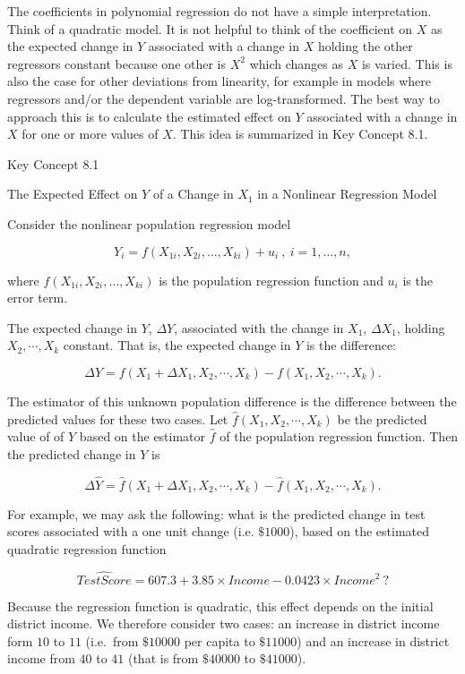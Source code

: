 \documentclass[]{book}
\theoremstyle{definition}
\theoremstyle{definition}
\theoremstyle{definition}
\theoremstyle{remark}
\begin{document}
The coefficients in polynomial regression do not have a simple
interpretation. Think of a quadratic model. It is not helpful to think
of the coefficient on \(X\) as the expected change in \(Y\) associated
with a change in \(X\) holding the other regressors constant because one
other is \(X^2\) which changes as \(X\) is varied. This is also the case
for other deviations from linearity, for example in models where
regressors and/or the dependent variable are log-transformed. The best
way to approach this is to calculate the estimated effect on \(Y\)
associated with a change in \(X\) for one or more values of \(X\). This
idea is summarized in Key Concept 8.1.

Key Concept 8.1

The Expected Effect on \(Y\) of a Change in \(X_1\) in a Nonlinear
Regression Model

Consider the nonlinear population regression model

\[ Y_i = f(X_{1i}, X_{2i}, \dots, X_{ki}) + u_i \ , \ i=1,\dots,n,\]

where \(f(X_{1i}, X_{2i}, \dots, X_{ki})\) is the population regression
function and \(u_i\) is the error term.

The expected change in \(Y\), \(\Delta Y\), associated with the change
in \(X_1\), \(\Delta X_1\), holding \(X_2, \cdots , X_k\) constant. That
is, the expected change in \(Y\) is the difference:

\[\Delta Y = f(X_1 + \Delta X_1, X_2, \cdots, X_k) - f(X_1, X_2, \cdots, X_k).\]

The estimator of this unknown population difference is the difference
between the predicted values for these two cases. Let
\(\hat{f}(X_1, X_2, \cdots, X_k)\) be the predicted value of of \(Y\)
based on the estimator \(\hat{f}\) of the population regression
function. Then the predicted change in \(Y\) is

\[\Delta \hat{Y} = \hat{f}(X_1 + \Delta X_1, X_2, \cdots, X_k) - \hat{f}(X_1, X_2, \cdots, X_k).\]

For example, we may ask the following: what is the predicted change in
test scores associated with a one unit change (i.e. \(\$1000\)), based
on the estimated quadratic regression function

\[\widehat{TestScore} = 607.3 + 3.85 \times Income - 0.0423 \times Income^2\ ?\]

Because the regression function is quadratic, this effect depends on the
initial district income. We therefore consider two cases: an increase in
district income form \(10\) to \(11\) (i.e.~from \(\$10000\) per capita
to \(\$11000\)) and an increase in district income from \(40\) to \(41\)
(that is from \(\$40000\) to \(\$41000\)).
\end{document}

